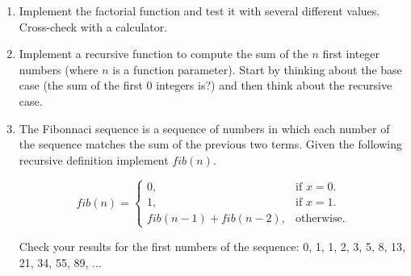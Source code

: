 \begin{enumerate}

\item Implement the factorial function and test it with several different values. Cross-check with a calculator.

\item Implement a recursive function to compute the sum of the $n$ first integer numbers (where $n$ is a function parameter). Start by thinking about the base case (the sum of the first 0 integers is?) and then think about the recursive case.

\item The Fibonnaci sequence is a sequence of numbers in which each number of the sequence matches the sum of the previous two terms. Given the following recursive definition implement $fib(n)$.

\begin{equation}
fib(n)=\begin{cases}
    0, & \text{if $x=0$}.\\
    1, & \text{if $x=1$}.\\
    fib(n-1) + fib(n-2), & \text{otherwise}.
\end{cases}
\end{equation}

Check your results for the first numbers of the sequence: 0, 1, 1, 2, 3, 5, 8, 13, 21, 34, 55, 89, ...

\end{enumerate}